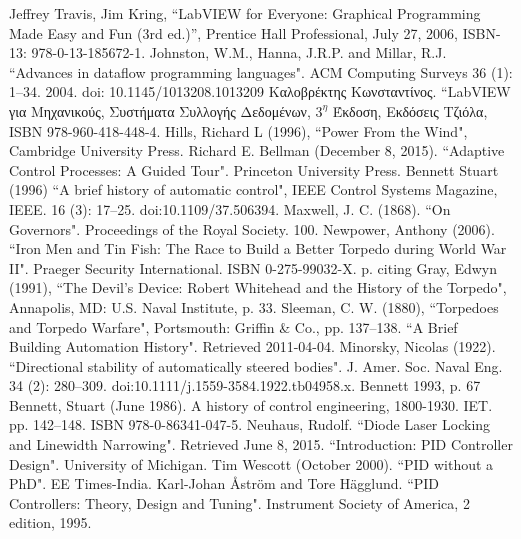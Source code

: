 
\begin{thebibliography}{99}

 Jeffrey Travis, Jim Kring, “LabVIEW for Everyone: Graphical Programming Made Easy and Fun (3rd ed.)”, Prentice Hall Professional, July 27, 2006, ISBN-13: 978-0-13-185672-1.
 Johnston, W.M., Hanna, J.R.P. and Millar, R.J. ``Advances in dataflow programming languages". ACM Computing Surveys 36 (1): 1–34. 2004. doi: 10.1145/1013208.1013209
 Καλοβρέκτης Κωνσταντίνος. ``LabVIEW για Μηχανικούς, Συστήματα Συλλογής Δεδομένων, $3^η$ Έκδοση, Εκδόσεις Τζιόλα, ISBN 978-960-418-448-4.
 Hills, Richard L (1996), ``Power From the Wind", Cambridge University Press.
 Richard E. Bellman (December 8, 2015). ``Adaptive Control Processes: A Guided Tour". Princeton University Press.
 Bennett Stuart (1996) ``A brief history of automatic control", IEEE Control Systems Magazine, IEEE. 16 (3): 17–25. doi:10.1109/37.506394.
 Maxwell, J. C. (1868). ``On Governors". Proceedings of the Royal Society. 100.
 Newpower, Anthony (2006). ``Iron Men and Tin Fish: The Race to Build a Better Torpedo during World War II". Praeger Security International. ISBN 0-275-99032-X. p.  citing Gray, Edwyn (1991), ``The Devil's Device: Robert Whitehead and the History of the Torpedo", Annapolis, MD: U.S. Naval Institute, p. 33.
 Sleeman, C. W. (1880), ``Torpedoes and Torpedo Warfare", Portsmouth: Griffin \& Co., pp. 137–138.
 ``A Brief Building Automation History". Retrieved 2011-04-04.
 Minorsky, Nicolas (1922). ``Directional stability of automatically steered bodies". J. Amer. Soc. Naval Eng. 34 (2): 280–309. doi:10.1111/j.1559-3584.1922.tb04958.x.
 Bennett 1993, p. 67
 Bennett, Stuart (June 1986). A history of control engineering, 1800-1930. IET. pp. 142–148. ISBN 978-0-86341-047-5.
 Neuhaus, Rudolf. ``Diode Laser Locking and Linewidth Narrowing". Retrieved June 8, 2015.
 ``Introduction: PID Controller Design". University of Michigan.
 Tim Wescott (October 2000). ``PID without a PhD". EE Times-India.
 Karl-Johan Åström and Tore Hägglund. ``PID Controllers: Theory, Design and Tuning". Instrument Society of America, 2 edition, 1995.

\end{thebibliography}
